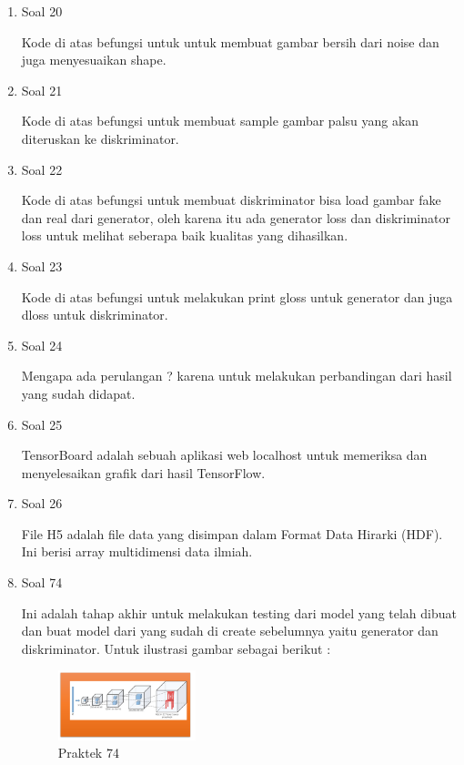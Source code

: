 \begin{enumerate}
    \item Soal 20
	\hfill\break
	
    Kode di atas befungsi untuk untuk membuat gambar bersih dari noise dan juga menyesuaikan shape.
    
    \item Soal 21
	\hfill\break
	
    Kode di atas befungsi untuk membuat sample gambar palsu yang akan diteruskan ke diskriminator.
    
    \item Soal 22
	\hfill\break
	
	Kode di atas befungsi untuk membuat diskriminator bisa load gambar fake dan real dari generator, oleh karena itu ada generator loss dan diskriminator loss untuk melihat seberapa baik kualitas yang dihasilkan.

    \item Soal 23
	\hfill\break
	
    Kode di atas befungsi untuk melakukan print gloss untuk generator dan juga dloss untuk diskriminator.
    
    \item Soal 24
	\hfill\break
	
    Mengapa ada perulangan ? karena untuk melakukan perbandingan dari hasil yang sudah didapat.
    
    \item Soal 25
	\hfill\break
	
    TensorBoard adalah sebuah aplikasi web localhost untuk memeriksa dan menyelesaikan grafik dari hasil TensorFlow.
    
    \item Soal 26
	\hfill\break
	
    File H5 adalah file data yang disimpan dalam Format Data Hirarki (HDF). Ini berisi array multidimensi data ilmiah.
    
    \item Soal 74
	\hfill\break
	
    Ini adalah tahap akhir untuk melakukan testing dari model yang telah dibuat dan buat model dari yang sudah di create sebelumnya yaitu generator dan diskriminator. Untuk ilustrasi gambar sebagai berikut : 
    \begin{figure}[H]
		\includegraphics[width=4cm]{figures/1174074/8/praktek74.png}
		\centering
		\caption{Praktek 74}
    \end{figure}
\end{enumerate}
